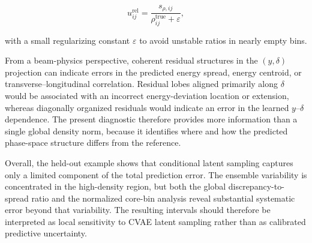 \begin{equation}
\label{eq:212}
u_{ij}^{\mathrm{rel}}=\frac{s_{\rho,ij}}{\rho_{ij}^{\mathrm{true}}+\varepsilon},
\end{equation}

with a small regularizing constant \(\varepsilon\) to avoid unstable ratios in nearly empty bins.

From a beam-physics perspective, coherent residual structures in the \(( y , \delta )\) projection can indicate errors in the predicted energy spread, energy centroid, or transverse–longitudinal correlation. Residual lobes aligned primarily along \(\delta\) would be associated with an incorrect energy-deviation location or extension, whereas diagonally organized residuals would indicate an error in the learned \(y – \delta\) dependence. The present diagnostic therefore provides more information than a single global density norm, because it identifies where and how the predicted phase-space structure differs from the reference.

Overall, the held-out example shows that conditional latent sampling captures only a limited component of the total prediction error. The ensemble variability is concentrated in the high-density region, but both the global discrepancy-to-spread ratio and the normalized core-bin analysis reveal substantial systematic error beyond that variability. The resulting intervals should therefore be interpreted as local sensitivity to CVAE latent sampling rather than as calibrated predictive uncertainty.

